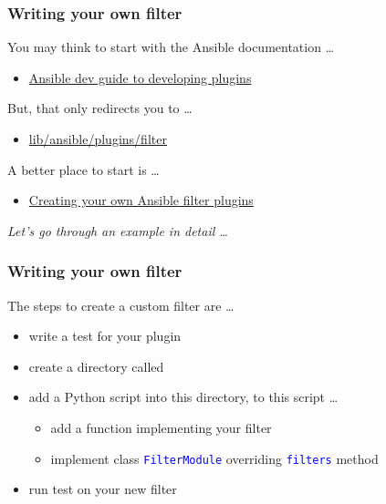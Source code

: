 \documentclass[pdf]{beamer}
\begin{document}
\begin{frame}
  \frametitle{Writing your own filter}
  You may think to start with the Ansible documentation \ldots
  \begin{itemize}
    \item \href{http://docs.ansible.com/ansible/dev_guide/developing_plugins.html}{Ansible dev guide to developing plugins}
  \end{itemize}
  \pause
  But, that only redirects you to \ldots
  \begin{itemize}
    \item \href{https://github.com/ansible/ansible/blob/devel/lib/ansible/plugins/filter/core.py}{lib/ansible/plugins/filter}
  \end{itemize}
  \pause
  A better place to start is \ldots
  \begin{itemize}
    \item \href{http://www.dasblinkenlichten.com/creating-ansible-filter-plugins/}{Creating your own Ansible filter plugins}
  \end{itemize}
  \bigskip
  \pause
  \textit{Let's go through an example in detail \ldots}
\end{frame}

\begin{frame}[t,fragile]
  \frametitle{Writing your own filter}
  The steps to create a custom filter are \ldots
  \begin{itemize}[<+-|alert@+>]
    \item {write a test for your plugin}
    \item {create a directory called }
    \item {add a Python script into this directory, to this script \ldots}
      \begin{itemize}
        \item {add a function implementing your filter}
        \item {implement class \textcolor{blue}{\texttt{FilterModule}} overriding \textcolor{blue}{\texttt{filters}} method}
      \end{itemize}
    \item {run test on your new filter}
  \end{itemize}
  \bigskip
\end{frame}
\end{document}
